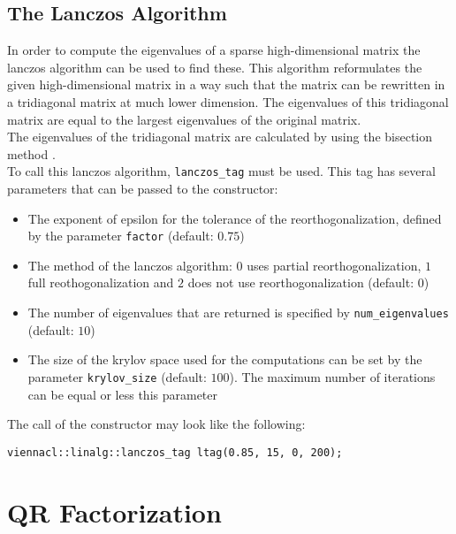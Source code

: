 
\subsection{The Lanczos Algorithm}
In order to compute the eigenvalues of a sparse high-dimensional matrix the lanczos algorithm can be used to find these. 
This algorithm reformulates the given high-dimensional matrix in a way such that the matrix can be rewritten in a tridiagonal matrix at much lower dimension. The eigenvalues of this tridiagonal matrix are equal to the largest eigenvalues of the original matrix. \\
The eigenvalues of the tridiagonal matrix are calculated by using the bisection method \cite{golub:matrix-computations}. \\
To call this lanczos algorithm, \lstinline|lanczos_tag| must be used.
This tag has several parameters that can be passed to the constructor:

\begin{itemize}
 \item The exponent of epsilon for the tolerance of the reorthogonalization, defined by the parameter \lstinline|factor| (default: $0.75$)
 \item The method of the lanczos algorithm: $0$ uses partial reorthogonalization, $1$ full reothogonalization and $2$ does not use reorthogonalization (default: $0$)
 \item The number of eigenvalues that are returned is specified by \lstinline|num_eigenvalues| (default: $10$)
 \item The size of the krylov space used for the computations can be set by the parameter \lstinline|krylov_size| (default: $100$). The maximum number of iterations can be equal or less this parameter
\end{itemize}
The call of the constructor may look like the following:
\begin{lstlisting}
viennacl::linalg::lanczos_tag ltag(0.85, 15, 0, 200);
\end{lstlisting}



\section{QR Factorization}


